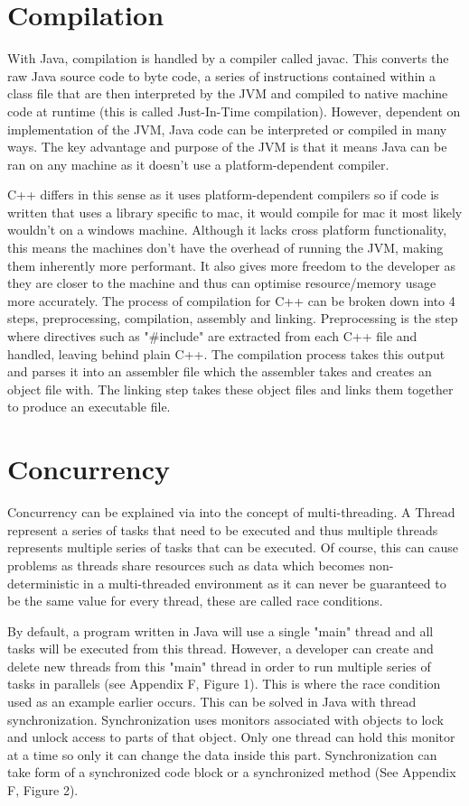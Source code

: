 \documentclass[]{report}
\begin{document}
\section{Compilation}
With Java, compilation is handled by a compiler called javac. This converts the raw Java source code to byte code, a series of instructions contained within a class file that are then interpreted by the JVM and compiled to native machine code at runtime (this is called Just-In-Time compilation). However, dependent on implementation of the JVM, Java code can be interpreted or compiled in many ways. The key advantage and purpose of the JVM is that it means Java can be ran on any machine as it doesn't use a platform-dependent compiler. \cite{CompilationJava}

C++ differs in this sense as it uses platform-dependent compilers so if code is written that uses a library specific to mac, it would compile for mac it most likely wouldn't on a windows machine. Although it lacks cross platform functionality, this means the machines don't have the overhead of running the JVM, making them inherently more performant. It also gives more freedom to the developer as they are closer to the machine	and thus can optimise resource/memory usage more accurately. The process of compilation for C++ can be broken down into 4 steps, preprocessing, compilation, assembly and linking. Preprocessing is the step where directives such as "\#include" are extracted from each C++ file and handled, leaving behind plain C++. The compilation process takes this output and parses it into an assembler file which the assembler takes and creates an object file with. The linking step takes these object files and links them together to produce an executable file. \cite{CompilationC++}

\section{Concurrency}
Concurrency can be explained via into the concept of multi-threading. A Thread represent a series of tasks that need to be executed and thus multiple threads represents multiple series of tasks that can be executed.  Of course, this can cause problems as threads share resources such as data which becomes non-deterministic in a multi-threaded environment as it can never be guaranteed to be the same value for every thread, these are called race conditions.

By default, a program written in Java will use a single "main" thread and all tasks will be executed from this thread. However, a developer can create and delete new threads from this "main" thread in order to run multiple series of tasks in parallels (see Appendix F, Figure 1). This is where the race condition used as an example earlier occurs. This can be solved in Java with thread synchronization. Synchronization uses monitors associated with objects to lock and unlock access to parts of that object. Only one thread can hold this monitor at a time so only it can change the data inside this part. Synchronization can take form of a synchronized code block or a synchronized method (See Appendix F, Figure 2).\cite{ConcurrencyJava}
\end{document}
